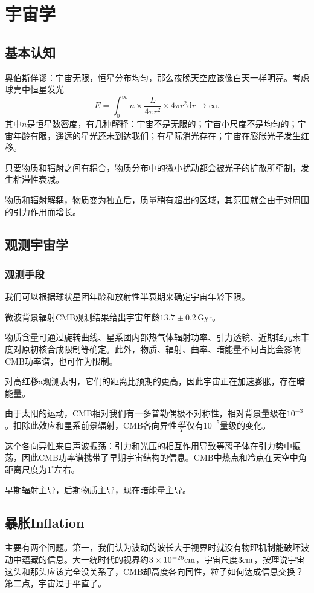 \documentclass[../天体物理基础.tex]{subfiles}
\begin{document}
\section{宇宙学}
\subsection{基本认知}
奥伯斯佯谬：宇宙无限，恒星分布均匀，那么夜晚天空应该像白天一样明亮。考虑球壳中恒星发光
\begin{equation}
E=\int_{0}^{\infty}n\times\frac{L}{4\pi r^{2}}\times4\pi r^{2}\mathrm{d}r\to\infty.
\end{equation}
其中$n$是恒星数密度，有几种解释：宇宙不是无限的；宇宙小尺度不是均匀的；宇宙年龄有限，遥远的星光还未到达我们；有星际消光存在；宇宙在膨胀光子发生红移。

只要物质和辐射之间有耦合，物质分布中的微小扰动都会被光子的扩散所牵制，发生粘滞性衰减。

物质和辐射解耦，物质变为独立后，质量稍有超出的区域，其范围就会由于对周围的引力作用而增长。

\subsection{观测宇宙学}
\subsubsection{观测手段}
我们可以根据球状星团年龄和放射性半衰期来确定宇宙年龄下限。

微波背景辐射CMB观测结果给出宇宙年龄$13.7\pm0.2\,\mathrm{Gyr}$。

物质含量可通过旋转曲线、星系团内部热气体辐射功率、引力透镜、近期轻元素丰度对原初核合成限制等确定。此外，物质、辐射、曲率、暗能量不同占比会影响CMB功率谱，也可作为限制。

对高红移\uppercase\expandafter{}a观测表明，它们的距离比预期的更高，因此宇宙正在加速膨胀，存在暗能量。

由于太阳的运动，CMB相对我们有一多普勒偶极不对称性，相对背景量级在$10^{-3}$。扣除此效应和星系前景辐射，CMB各向异性$\frac{\Delta{}T}{T}$仅有$10^{-5}$量级的变化。

这个各向异性来自声波振荡：引力和光压的相互作用导致等离子体在引力势中振荡，因此CMB功率谱携带了早期宇宙结构的信息。CMB中热点和冷点在天空中角距离尺度为$1^{\circ}$左右。

早期辐射主导，后期物质主导，现在暗能量主导。



\subsection{暴胀Inflation}
主要有两个问题。第一，我们认为波动的波长大于视界时就没有物理机制能破坏波动中蕴藏的信息。大一统时代的视界约$3\times10^{-26}\rm cm$，宇宙尺度$3\rm cm$，按理说宇宙这头和那头应该完全没关系了，CMB却高度各向同性，粒子如何达成信息交换？第二点，宇宙过于平直了。
\end{document}
